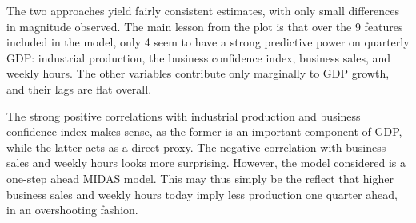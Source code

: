 The two approaches yield fairly consistent estimates, with only small differences in magnitude observed. The main lesson from the plot is that over the 9 features included in the model, only 4 seem to have a strong predictive power on quarterly GDP: industrial production, the business confidence index, business sales, and weekly hours. The other variables contribute only marginally to GDP growth, and their lags are flat overall.

The strong positive correlations with industrial production and business confidence index makes sense, as the former is an important component of GDP, while the latter acts as a direct proxy. The negative correlation with business sales and weekly hours looks more surprising. However, the model considered is a one-step ahead MIDAS model. This may thus simply be the reflect that higher business sales and weekly hours today imply less production one quarter ahead, in an overshooting fashion.

\newpage

